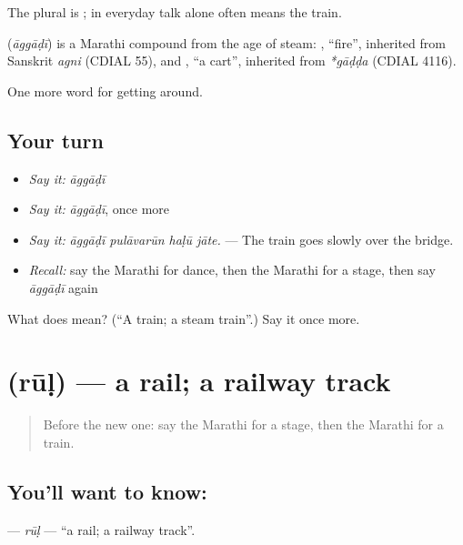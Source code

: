 The plural is ; in everyday talk  alone often means the train.

\begin{cousinweb}
\textbf{} (\emph{āggāḍī}) is a Marathi compound from the age of steam: \textbf{}, \textquotedblleft{}fire\textquotedblright{}, inherited from Sanskrit \emph{agni} (CDIAL 55), and \textbf{}, \textquotedblleft{}a cart\textquotedblright{}, inherited from \emph{*gāḍḍa} (CDIAL 4116).
\end{cousinweb}

\begin{grammarlens}[title={What you've built}]
One more word for getting around.
\end{grammarlens}

\subsection*{Your turn}
\begin{itemize}
\raggedright
  \item \emph{Say it:} \emph{āggāḍī}
  \item \emph{Say it:} \emph{āggāḍī}, once more
  \item \emph{Say it:} \emph{āggāḍī pulāvarūn haḷū jāte.} — The train goes slowly over the bridge.
  \item \emph{Recall:} say the Marathi for dance, then the Marathi for a stage, then say \emph{āggāḍī} again
\end{itemize}

\begin{tcolorbox}[breakable,colback=teal!4,colframe=teal!35!black,title={Before you move on}]
What does  mean? (\textquotedblleft{}A train; a steam train\textquotedblright{}.) Say it once more.
\end{tcolorbox}
\section[\texorpdfstring{\mr{रूळ} (rūḷ)}{रूळ (rūḷ)}]{ (rūḷ) — a rail; a railway track}

\label{lesson:MR-C396-rul}



\begin{quote}
Before the new one: say the Marathi for a stage, then the Marathi for a train.
\end{quote}

\subsection*{You'll want to know: }
\textbf{} — \emph{rūḷ} — \textquotedblleft{}a rail; a railway track\textquotedblright{}.

